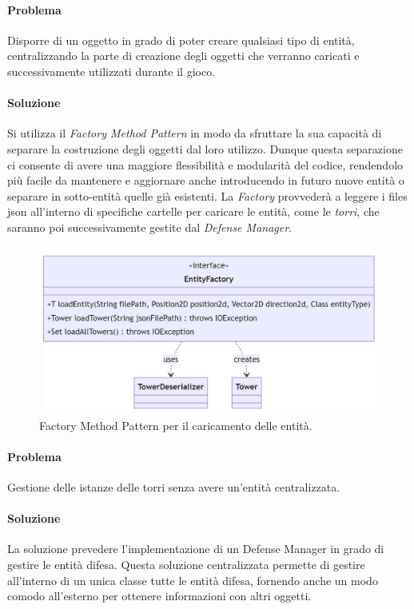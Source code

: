 \documentclass[a4paper,12pt]{report}
\begin{document}
\vspace{15mm}

\paragraph{Problema}
Disporre di un oggetto in grado di poter creare qualsiasi tipo di entità, centralizzando la parte di creazione degli oggetti che verranno caricati e successivamente utilizzati durante il gioco.

\paragraph{Soluzione}
Si utilizza il \textit{Factory Method Pattern} in modo da sfruttare la sua capacità di separare la costruzione degli oggetti dal loro utilizzo. Dunque questa separazione ci consente di avere una maggiore flessibilità e modularità del codice, rendendolo più facile da mantenere e aggiornare anche introducendo in futuro nuove entità o separare in sotto-entità quelle già esistenti. 
La \textit{Factory} provvederà a leggere i files json all'interno di specifiche cartelle per caricare
le entità, come le \textit{torri}, che saranno poi successivamente gestite dal \textit{Defense Manager}.


\begin{figure}[H]
    \centering
    \includegraphics[width=1.1\linewidth]{entity_factory}
    \caption{Factory Method Pattern per il caricamento delle entità.}
    \label{fig:entity_factory}
\end{figure}
\vspace{70mm}

\paragraph{Problema}
Gestione delle istanze delle torri senza avere un'entità centralizzata.
\paragraph{Soluzione}
La soluzione prevedere l'implementazione di un Defense Manager in grado di gestire le entità difesa. Questa soluzione centralizzata permette di gestire all'interno di un unica classe tutte le entità difesa, fornendo anche un modo comodo all'esterno per ottenere informazioni con altri oggetti.
\end{document}
